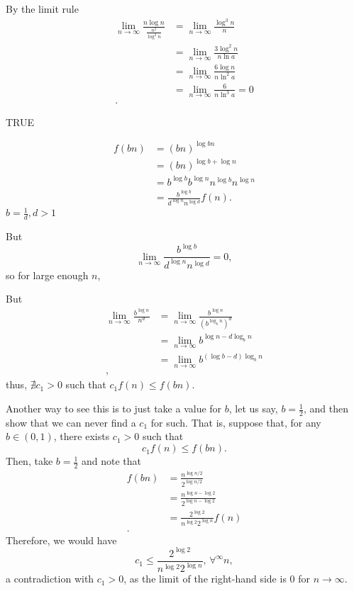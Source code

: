  


By the limit rule
\begin{align*}
    \lim_{n \to \infty} \frac{n \log n}{\frac{n^2}{\log^2 n}} &= \lim_{n \to \infty} \frac{\log^3 n}{n} \\
    &= \lim_{n \to \infty} \frac{3 \log^2 n}{n \ln a} \\
    &= \lim_{n \to \infty} \frac{6 \log n}{n \ln^2 a} \\
    &= \lim_{n \to \infty} \frac{6}{n \ln^3 a} = 0 \\
.\end{align*}

TRUE


\begin{align*}
    f(bn) &= \left( bn \right)^{\log bn} \\
	&= (bn)^{\log b + \log n} \\
	&= b^{\log b}b^{\log n}n^{\log b}n^{\log n} \\
	&=  \frac{b^{\log b}}{d^{\log n}n^{\log d}} f(n)
.\end{align*}
$b = \frac{1}{d}, d > 1$ 

But \[
\lim_{n \to \infty} \frac{b^{\log b}}{d^{\log n}n^{\log d}} = 0
,\]  so for large enough $n$, 

But
\begin{align*}
    \lim_{n \to \infty} \frac{b^{\log n}}{n^{d}} &= \lim_{n \to \infty} \frac{b^{\log n}}{\left( b^{\log_b n} \right)^{d}} \\
    &= \lim_{n \to \infty} b^{\log n - d \log_b n} \\
    &= \lim_{n \to \infty} b^{(\log b - d)\log_b n} \\
,\end{align*}
thus, $\nexists c_1 > 0$ such that $c_1f(n) \le f(bn)$.

Another way to see this is to just take a value for $b$, let us say, $b=\frac{1}{2}$, and then show that we can never find a $c_1$ for such.
That is, suppose that, for any $b\in (0,1)$, there exists $c_1>0$ such that \[
c_1f(n) \le f(bn)
.\] Then, take $b=\frac{1}{2}$ and note that
\begin{align*}
    f(bn) &= \frac{n^{\log n / 2}}{2^{\log n / 2}} \\
    &= \frac{n^{\log n - \log 2}}{2^{\log n - \log 2}} \\
    &= \frac{2^{\log 2}}{n^{\log 2}2^{\log n}} f(n) \\
.\end{align*}
Therefore, we would have \[
c_1 \le \frac{2^{\log 2}}{n^{\log 2}2^{\log n}},\, \forall^{\infty}n
,\] a contradiction with $c_1>0$, as the limit of the right-hand side is 0 for $n\to \infty$.

